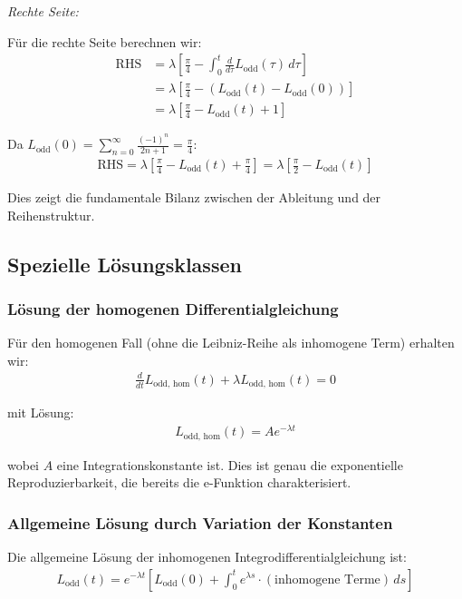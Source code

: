 \documentclass[a4paper,12pt,twoside]{report}
\theoremstyle{definition}
\begin{document}
\textit{Rechte Seite:}

Für die rechte Seite berechnen wir:
\begin{align}
	\text{RHS} &= \lambda \left[ \frac{\pi}{4} - \int_0^t \frac{d}{d\tau} L_{\text{odd}}(\tau) \, d\tau \right] \\
	&= \lambda \left[ \frac{\pi}{4} - (L_{\text{odd}}(t) - L_{\text{odd}}(0)) \right] \\
	&= \lambda \left[ \frac{\pi}{4} - L_{\text{odd}}(t) + 1 \right]
\end{align}

Da $L_{\text{odd}}(0) = \sum_{n=0}^{\infty} \frac{(-1)^n}{2n+1} = \frac{\pi}{4}$:
\begin{align}
	\text{RHS} = \lambda \left[ \frac{\pi}{4} - L_{\text{odd}}(t) + \frac{\pi}{4} \right] = \lambda \left[ \frac{\pi}{2} - L_{\text{odd}}(t) \right]
\end{align}

Dies zeigt die fundamentale Bilanz zwischen der Ableitung und der Reihenstruktur.

\subsection{Spezielle Lösungsklassen}

\subsubsection*{Lösung der homogenen Differentialgleichung}

Für den homogenen Fall (ohne die Leibniz-Reihe als inhomogene Term) erhalten wir:
\begin{align}
	\frac{d}{dt} L_{\text{odd, hom}}(t) + \lambda L_{\text{odd, hom}}(t) = 0
\end{align}

mit Lösung:
\begin{align}
	L_{\text{odd, hom}}(t) = A e^{-\lambda t}
\end{align}

wobei $A$ eine Integrationskonstante ist. Dies ist genau die exponentielle Reproduzierbarkeit, die bereits die e-Funktion charakterisiert.

\subsubsection*{Allgemeine Lösung durch Variation der Konstanten}

Die allgemeine Lösung der inhomogenen Integrodifferentialgleichung ist:
\begin{align}
	L_{\text{odd}}(t) = e^{-\lambda t} \left[ L_{\text{odd}}(0) + \int_0^t e^{\lambda s} \cdot (\text{inhomogene Terme}) \, ds \right]
\end{align}
\end{document}
